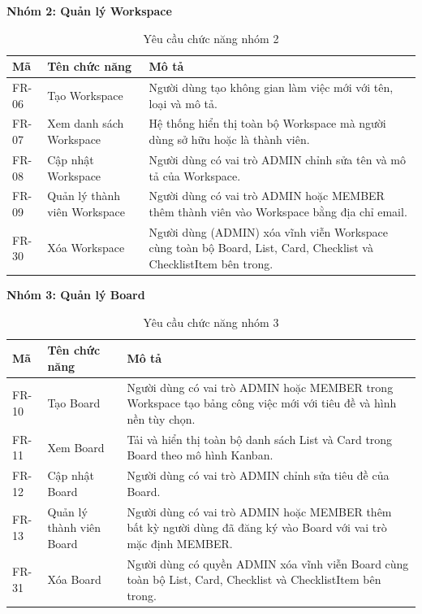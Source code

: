 \textbf{Nhóm 2: Quản lý Workspace}

\begin{table}[H]
\centering
\begin{tabular}{|p{1.8cm}|p{4cm}|p{8.2cm}|}
\hline
\textbf{Mã} & \textbf{Tên chức năng} & \textbf{Mô tả} \\
\hline
FR-06 & Tạo Workspace & Người dùng tạo không gian làm việc mới với tên, loại và mô tả. \\
\hline
FR-07 & Xem danh sách Workspace & Hệ thống hiển thị toàn bộ Workspace mà người dùng sở hữu hoặc là thành viên. \\
\hline
FR-08 & Cập nhật Workspace & Người dùng có vai trò ADMIN chỉnh sửa tên và mô tả của Workspace. \\
\hline
FR-09 & Quản lý thành viên Workspace & Người dùng có vai trò ADMIN hoặc MEMBER thêm thành viên vào Workspace bằng địa chỉ email. \\
\hline
FR-30 & Xóa Workspace & Người dùng (ADMIN) xóa vĩnh viễn Workspace cùng toàn bộ Board, List, Card, Checklist và ChecklistItem bên trong. \\
\hline
\end{tabular}
\caption{Yêu cầu chức năng nhóm 2}
\label{tab:fr_workspace}
\end{table}

\textbf{Nhóm 3: Quản lý Board}

\begin{table}[H]
\centering
\begin{tabular}{|p{1.8cm}|p{4cm}|p{8.2cm}|}
\hline
\textbf{Mã} & \textbf{Tên chức năng} & \textbf{Mô tả} \\
\hline
FR-10 & Tạo Board & Người dùng có vai trò ADMIN hoặc MEMBER trong Workspace tạo bảng công việc mới với tiêu đề và hình nền tùy chọn. \\
\hline
FR-11 & Xem Board & Tải và hiển thị toàn bộ danh sách List và Card trong Board theo mô hình Kanban. \\
\hline
FR-12 & Cập nhật Board & Người dùng có vai trò ADMIN chỉnh sửa tiêu đề của Board. \\
\hline
FR-13 & Quản lý thành viên Board & Người dùng có vai trò ADMIN hoặc MEMBER thêm bất kỳ người dùng đã đăng ký vào Board với vai trò mặc định MEMBER. \\
\hline
FR-31 & Xóa Board & Người dùng có quyền ADMIN xóa vĩnh viễn Board cùng toàn bộ List, Card, Checklist và ChecklistItem bên trong. \\
\hline
\end{tabular}
\caption{Yêu cầu chức năng nhóm 3}
\label{tab:fr_board}
\end{table}

